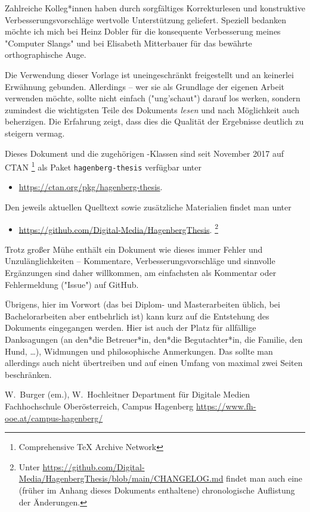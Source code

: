 Zahlreiche Kolleg*innen haben durch sorgfältiges Korrekturlesen und
konstruktive Verbesserungsvorschläge wertvolle Unterstützung
geliefert. Speziell bedanken möchte ich mich bei Heinz Dobler für
die konsequente Verbesserung meines "Computer Slangs" und bei
Elisabeth Mitterbauer für das bewährte orthographische Auge.

Die Verwendung dieser Vorlage ist uneingeschränkt freigestellt und an
keinerlei Erwähnung gebunden. Allerdings -- wer sie als Grundlage
der eigenen Arbeit verwenden möchte, sollte nicht einfach
("ung'schaut") darauf los werken, sondern zumindest die
wichtigsten Teile des Dokuments \emph{lesen} und nach Möglichkeit
auch beherzigen. Die Erfahrung zeigt, dass dies die Qualität der
Ergebnisse deutlich zu steigern vermag.

Dieses Dokument und die zugehörigen \latex-Klassen sind seit November 2017 auf CTAN%
\footnote{Comprehensive TeX Archive Network} 
als Paket \texttt{hagenberg-thesis} verfügbar unter
%
\begin{itemize}
\item[]\url{https://ctan.org/pkg/hagenberg-thesis}.
\end{itemize}
%
Den jeweils aktuellen Quelltext sowie zusätzliche Materialien findet man unter
%
\begin{itemize}
\item[]\url{https://github.com/Digital-Media/HagenbergThesis}.%
\footnote{Unter \url{https://github.com/Digital-Media/HagenbergThesis/blob/main/CHANGELOG.md}
findet man auch eine (früher im Anhang dieses Dokuments enthaltene) chronologische Auflistung der 
Änderungen.}
\end{itemize}

\noindent
Trotz großer Mühe enthält ein Dokument wie dieses immer Fehler und Unzulänglichkeiten
-- Kommentare, Verbesserungsvorschläge und sinnvolle Ergänzungen
sind daher willkommen, am einfachsten als Kommentar oder Fehlermeldung ("Issue") auf GitHub.


Übrigens, hier im Vorwort (das bei Diplom- und Masterarbeiten üblich, bei Bachelor\-arbeiten 
aber entbehrlich ist) kann kurz auf die Entstehung des Dokuments eingegangen werden.
Hier ist auch der Platz für allfällige Danksagungen (\zB an den*die Betreuer*in, 
den*die Begutachter*in, die Familie, den Hund, \ldots), Widmungen und philosophische 
Anmerkungen. Das sollte man allerdings auch nicht übertreiben und auf 
einen Umfang von maximal zwei Seiten beschränken.

\vspace{6ex}
\noindent
W.\ Burger (em.), W.\ Hochleitner\newline
Department für Digitale Medien\newline
Fachhochschule Oberösterreich, Campus Hagenberg\newline
\url{https://www.fh-ooe.at/campus-hagenberg/}

